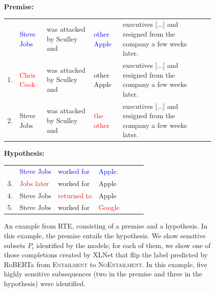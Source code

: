 \documentclass[11pt,a4paper]{article}
\begin{document}
\begin{figure}
\textbf{Premise:}

{\footnotesize
\setlength{\tabcolsep}{0.1em}
            \begin{tabular}{lllllll}
     & \textcolor{blue}{Steve Jobs} & was attacked by Sculley and & \textcolor{blue}{other Apple} & executives [...] and resigned from the company a few weeks later.  \\
    1. & \textcolor{red}{Chris Cook} & was attacked by Sculley and & other Apple & executives [...] and resigned from the company a few weeks later. \\
    2. & Steve Jobs & was attacked by Sculley and & \textcolor{red}{the other} & executives [...] and resigned from the company a few weeks later. \\
        \end{tabular}
        }
        
        
    
    \textbf{Hypothesis:}
    
    
    {\footnotesize
    \setlength{\tabcolsep}{0.1em}
        \begin{tabular}{lllllll}
    & \textcolor{blue}{Steve Jobs} & \textcolor{blue}{worked for} &  \textcolor{blue}{Apple}. \\
    3. & \textcolor{red}{Jobs  later} & worked for & Apple \\
     4. &Steve Jobs & \textcolor{red}{returned to} & Apple \\
     5. & Steve Jobs & worked for & \textcolor{red}{Google} \\
    \end{tabular}
    }
     
	\caption{An example from RTE, consisting of a premise and a hypothesis.
    In this example, the premise entails the hypothesis.
We show sensitive subsets $P_i$ identified by the models; for each of them, we show one of those completions created by XLNet that flip the label predicted by RoBERTa from \textsc{Entailment} to \textsc{NoEntailment}.
    In this example, five highly sensitive subsequences (two in the premise and three in the hypothesis) were identified.
    }
    \label{fig:ex-rte}
\end{figure}
\end{document}
